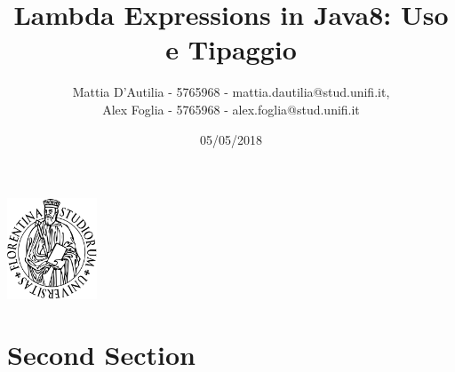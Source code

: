 \documentclass{beamer}
\title[Lambda in Java8]{Lambda Expressions in Java8: Uso e Tipaggio}
\author[]{Mattia D'Autilia - 5765968 - mattia.dautilia@stud.unifi.it,\\ Alex Foglia - 5765968 - alex.foglia@stud.unifi.it}
\date{05/05/2018}
\begin{document}
\begin{frame}
	\begin{center}
  		\includegraphics[width=0.2\textwidth]{assets/logo-unifi.png}
  	\end{center}
	\titlepage 
\end{frame}

\begin{frame}
\end{frame}


\begin{frame}
\end{frame}


\begin{frame}
\end{frame}


\begin{frame}
\end{frame}

\section{Second Section}

\begin{frame}
\end{frame}


\begin{frame}
\end{frame}


\begin{frame}
\end{frame}


\begin{frame}
\end{frame}
\end{document}
